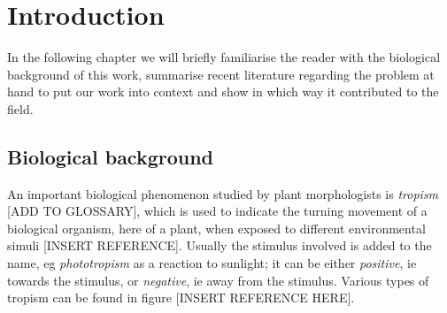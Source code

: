 
\chapter{Introduction} %

\label{introduction} %


\newcommand{\keyword}[1]{\textbf{#1}}
\newcommand{\tabhead}[1]{\textbf{#1}}
\newcommand{\code}[1]{\texttt{#1}}
\newcommand{\file}[1]{\texttt{\bfseries#1}}
\newcommand{\option}[1]{\texttt{\itshape#1}}



In the following chapter we will briefly familiarise the reader with the biological background of this work, summarise recent literature regarding the problem at hand to put our work into context and show in which way it contributed to the field.

\section{Biological background}

An important biological phenomenon studied by plant morphologists is \textit{tropism} [ADD TO GLOSSARY], which is used to indicate the turning movement of a biological organism, here of a plant, when exposed to different environmental simuli [INSERT REFERENCE]. Usually the stimulus involved is added to the name, eg \textit{phototropism} as a reaction to sunlight; it can be either \textit{positive}, ie towards the stimulus, or \textit{negative}, ie away from the stimulus. 
Various types of tropism can be found in figure [INSERT REFERENCE HERE].

